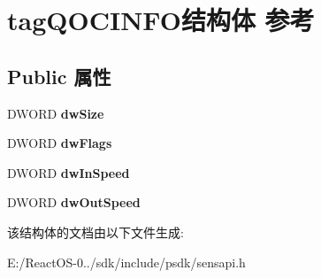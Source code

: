 \hypertarget{structtag_q_o_c_i_n_f_o}{}\section{tag\+Q\+O\+C\+I\+N\+F\+O结构体 参考}
\label{structtag_q_o_c_i_n_f_o}
\subsection*{Public 属性}
\begin{DoxyCompactItemize}
\item 
\mbox{\label{structtag_q_o_c_i_n_f_o_a43c2141ef3d73a064783103c4ce512bf}} 
D\+W\+O\+RD {\bfseries dw\+Size}
\item 
\mbox{\label{structtag_q_o_c_i_n_f_o_a3543ff9dbcd3f9b9785dc31033da7252}} 
D\+W\+O\+RD {\bfseries dw\+Flags}
\item 
\mbox{\label{structtag_q_o_c_i_n_f_o_aa764bd8e9cd3c45094e5c44927a44aba}} 
D\+W\+O\+RD {\bfseries dw\+In\+Speed}
\item 
\mbox{\label{structtag_q_o_c_i_n_f_o_a613776367279ac1d221bb92a3cda9deb}} 
D\+W\+O\+RD {\bfseries dw\+Out\+Speed}
\end{DoxyCompactItemize}


该结构体的文档由以下文件生成\+:\begin{DoxyCompactItemize}
\item 
E\+:/\+React\+O\+S-\/0../sdk/include/psdk/sensapi.\+h\end{DoxyCompactItemize}
